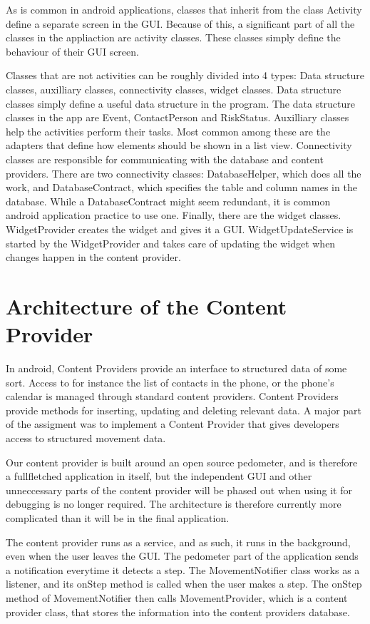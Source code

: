 As is common in android applications, classes that inherit from the class Activity define a separate screen in the GUI. Because of this, a significant part of all the classes in the appliaction are activity classes. These classes simply define the behaviour of their GUI screen.

Classes that are not activities can be roughly divided into 4 types: Data structure classes, auxilliary classes, connectivity classes, widget classes. Data structure classes simply define a useful data structure in the program. The data structure classes in the app are Event, ContactPerson and RiskStatus. Auxilliary classes help the activities perform their tasks. Most common among these are the adapters that define how elements should be shown in a list view. Connectivity classes are responsible for communicating with the database and content providers. There are two connectivity classes: DatabaseHelper, which does all the work, and DatabaseContract, which specifies the table and column names in the database. While a DatabaseContract might seem redundant, it is common android application practice to use one. Finally, there are the widget classes. WidgetProvider creates the widget and gives it a GUI. WidgetUpdateService is started by the WidgetProvider and takes care of updating the widget when changes happen in the content provider.

\section{Architecture of the Content Provider}
In android, Content Providers provide an interface to structured data of some sort. Access to for instance the list of contacts in the phone, or the phone's calendar is managed through standard content providers. Content Providers provide methods for inserting, updating and deleting relevant data. A major part of the assigment was to implement a Content Provider that gives developers access to structured movement data.

Our content provider is built around an open source pedometer, and is therefore a fullfletched application in itself, but the independent GUI and other unneccessary parts of the content provider will be phased out when using it for debugging is no longer required. The architecture is therefore currently more complicated than it will be in the final application.

The content provider runs as a service, and as such, it runs in the background, even when the user leaves the GUI. The pedometer part of the application sends a notification everytime it detects a step. The MovementNotifier class works as a listener, and its onStep method is called when the user makes a step. The onStep method of MovementNotifier then calls MovementProvider, which is a content provider class, that stores the information into the content providers database.

